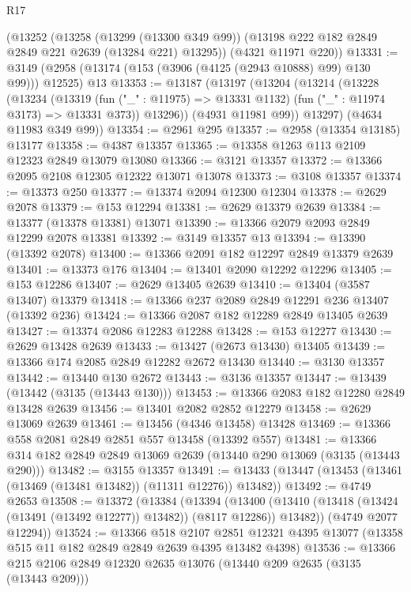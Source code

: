 \begin{lexlean}{R17}
\begin{coremodule}
    (@13252
      (@13258
        (@13299 (@13300 @349 @99))
        (@13198 @222 @182 @2849 @2849 @221 @2639 (@13284 @221) @13295))
      (@4321 @11971 @220))
@13331 := @3149 (@2958 (@13174 (@153 (@3906 (@4125 (@2943 @10888) @99) @130 @99))) @12525) @13
@13353 := @13187
    (@13197
      (@13204
        (@13214
          (@13228
            (@13234
              (@13319
                (fun ("_" : @11975) => @13331 @1132)
                (fun ("_" : @11974 @3173) => @13331 @373))
              @13296))
          (@4931 @11981 @99))
        @13297)
      (@4634 @11983 @349 @99))
@13354 := @2961 @295
@13357 := @2958 (@13354 @13185) @13177
@13358 := @4387 @13357
@13365 := @13358 @1263 @113 @2109 @12323 @2849 @13079 @13080
@13366 := @3121 @13357
@13372 := @13366 @2095 @2108 @12305 @12322 @13071 @13078
@13373 := @3108 @13357
@13374 := @13373 @250
@13377 := @13374 @2094 @12300 @12304
@13378 := @2629 @2078
@13379 := @153 @12294
@13381 := @2629 @13379 @2639
@13384 := @13377 (@13378 @13381) @13071
@13390 := @13366 @2079 @2093 @2849 @12299 @2078 @13381
@13392 := @3149 @13357 @13
@13394 := @13390 (@13392 @2078)
@13400 := @13366 @2091 @182 @12297 @2849 @13379 @2639
@13401 := @13373 @176
@13404 := @13401 @2090 @12292 @12296
@13405 := @153 @12286
@13407 := @2629 @13405 @2639
@13410 := @13404 (@3587 @13407) @13379
@13418 := @13366 @237 @2089 @2849 @12291 @236 @13407 (@13392 @236)
@13424 := @13366 @2087 @182 @12289 @2849 @13405 @2639
@13427 := @13374 @2086 @12283 @12288
@13428 := @153 @12277
@13430 := @2629 @13428 @2639
@13433 := @13427 (@2673 @13430) @13405
@13439 := @13366 @174 @2085 @2849 @12282 @2672 @13430
@13440 := @3130 @13357
@13442 := @13440 @130 @2672
@13443 := @3136 @13357
@13447 := @13439 (@13442 (@3135 (@13443 @130)))
@13453 := @13366 @2083 @182 @12280 @2849 @13428 @2639
@13456 := @13401 @2082 @2852 @12279
@13458 := @2629 @13069 @2639
@13461 := @13456 (@4346 @13458) @13428
@13469 := @13366 @558 @2081 @2849 @2851 @557 @13458 (@13392 @557)
@13481 := @13366 @314 @182 @2849 @2849 @13069 @2639 (@13440 @290 @13069 (@3135 (@13443 @290)))
@13482 := @3155 @13357
@13491 := @13433 (@13447 (@13453 (@13461 (@13469 (@13481 @13482)) (@11311 @12276)) @13482))
@13492 := @4749 @2653
@13508 := @13372
    (@13384
      (@13394
        (@13400 (@13410 (@13418 (@13424 (@13491 (@13492 @12277)) @13482)) (@8117 @12286)) @13482))
      (@4749 @2077 @12294))
@13524 := @13366
    @518
    @2107
    @2851
    @12321
    @4395
    @13077
    (@13358 @515 @11 @182 @2849 @2849 @2639 @4395 @13482 @4398)
@13536 := @13366 @215 @2106 @2849 @12320 @2635 @13076 (@13440 @209 @2635 (@3135 (@13443 @209)))

\end{coremodule}
\end{lexlean}
